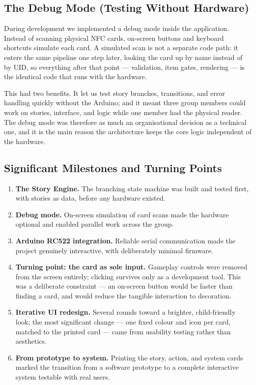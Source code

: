\subsection{The Debug Mode (Testing Without Hardware)}
During development we implemented a debug mode inside the application. Instead
of scanning physical NFC cards, on-screen buttons and keyboard shortcuts
simulate each card. A simulated scan is not a separate code path: it enters
the same pipeline one step later, looking the card up by name instead of by
UID, so everything after that point --- validation, item gates, rendering ---
is the identical code that runs with the hardware.

This had two benefits. It let us test story branches, transitions, and error
handling quickly without the Arduino; and it meant three group members could
work on stories, interface, and logic while one member had the physical
reader. The debug mode was therefore as much an organisational decision as a
technical one, and it is the main reason the architecture keeps the core
logic independent of the hardware.

\subsection{Significant Milestones and Turning Points}
\begin{enumerate}
  \item \textbf{The Story Engine.} The branching state machine was built and
        tested first, with stories as data, before any hardware existed.
  \item \textbf{Debug mode.} On-screen simulation of card scans made the
        hardware optional and enabled parallel work across the group.
  \item \textbf{Arduino RC522 integration.} Reliable serial communication
        made the project genuinely interactive, with deliberately minimal
        firmware.
  \item \textbf{Turning point: the card as sole input.} Gameplay controls
        were removed from the screen entirely; clicking survives only as a
        development tool. This was a deliberate constraint --- an on-screen
        button would be faster than finding a card, and would reduce the
        tangible interaction to decoration.
  \item \textbf{Iterative UI redesign.} Several rounds toward a brighter,
        child-friendly look; the most significant change --- one fixed colour
        and icon per card, matched to the printed card --- came from
        usability testing rather than aesthetics.
  \item \textbf{From prototype to system.} Printing the story, action, and
        system cards marked the transition from a software prototype to a
        complete interactive system testable with real users.
\end{enumerate}

